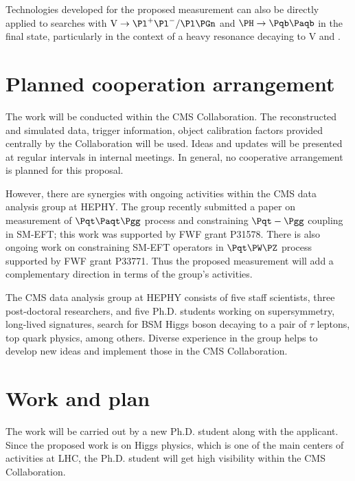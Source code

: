 \documentclass[a4paper,11pt]{article}
\newcommand{\Pb}{{{\Pqb}}\xspace}
\newcommand{\Pt}{{{\Pqt}}\xspace}
\newcommand{\PAb}{{{{\Paqb}}}\xspace}
\newcommand{\PAt}{{{{\Paqt}}}\xspace}
\renewcommand{\PV}{{{{V}}}\xspace}
\begin{document}
{Technologies developed for the proposed measurement can also be directly applied to searches with $\textrm{\PV}\rightarrow \Pl^{+}\Pl^{-} / \Pl \Pgn$ and $\PH \to \Pb \PAb$ in the final state, particularly in the context of a heavy resonance decaying to \PV and {\PH}.


\section{Planned cooperation arrangement} 

The work will be conducted within the CMS Collaboration. The reconstructed and simulated data, trigger information, object calibration factors provided centrally by the Collaboration will be used. 
Ideas and updates will be presented at regular intervals in internal meetings. 
In general, no cooperative arrangement is planned for this proposal. 

However, there are synergies with ongoing activities within the CMS data analysis group at HEPHY. 
The group recently submitted a paper on measurement of $\Pt\PAt\Pgg$ process and constraining $\Pt-\Pgg$ coupling in SM-EFT; this work was supported by FWF grant P31578.
There is also ongoing work on constraining SM-EFT operators in $\Pt\PW\PZ$ process supported by FWF grant P33771. 
Thus the proposed measurement will add a complementary direction in terms of the group's activities.

The CMS data analysis group at HEPHY consists of five staff scientists, three post-doctoral researchers, and five Ph.D. students working on supersymmetry, long-lived signatures, search for BSM Higgs boson decaying to a pair of $\tau$ leptons, top quark physics, among others. 
Diverse experience in the group helps to develop new ideas and implement those in the CMS Collaboration.

\section{Work and plan}

The work will be carried out by a new Ph.D. student along with the applicant. 
Since the proposed work is on Higgs physics, which is one of the main centers of activities at LHC, the  
Ph.D. student will get high visibility within the CMS Collaboration.  

}
\end{document}

